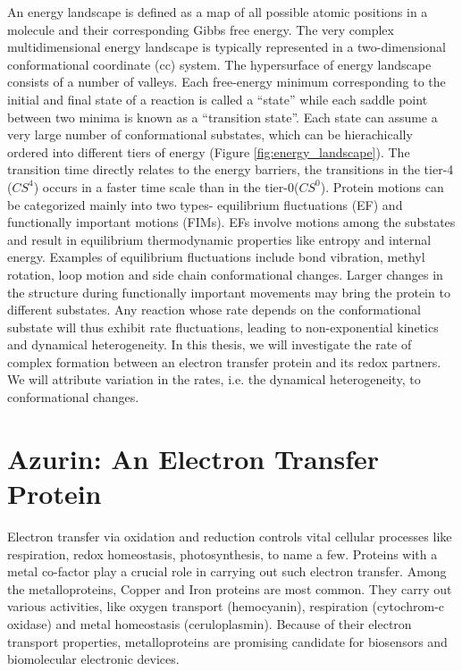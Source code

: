An energy landscape is defined as a map of all possible atomic positions in a molecule and their corresponding Gibbs free energy.
The very complex multidimensional energy landscape is typically represented in a two-dimensional conformational coordinate (cc) system.
The hypersurface of energy landscape consists of a number of valleys. Each free-energy minimum corresponding to the initial and final state of a reaction is called a ``state'' while each saddle point between two minima is known as a ``transition state''.
Each state can assume a very large number of conformational substates, which can be hierachically ordered into different tiers of energy (Figure \ref{fig:energy_landscape}).
The transition time directly relates to the energy barriers, the transitions in the tier-4 ($CS^4$) occurs in a faster time scale than in the tier-0($CS^0$).
Protein motions can be categorized mainly into two types- equilibrium fluctuations (EF) and  functionally important motions (FIMs).\cite{ansari1985protein}
EFs involve motions among the substates and result in equilibrium thermodynamic properties like entropy and internal energy. 
Examples of equilibrium fluctuations include bond vibration, methyl rotation, loop motion and side chain conformational changes. Larger changes in the structure during functionally important movements may bring the protein to different substates. Any reaction whose rate depends on the conformational substate will thus exhibit rate fluctuations, leading to non-exponential kinetics and dynamical heterogeneity. In this thesis, we will investigate the rate of complex formation between an electron transfer protein and its redox partners. We will attribute variation in the rates, i.e. the dynamical heterogeneity, to conformational changes.

\section{Azurin: An Electron Transfer Protein}
Electron transfer via oxidation and reduction controls vital cellular processes like respiration, redox homeostasis, photosynthesis, to name a few.
Proteins with a metal co-factor play a crucial role in carrying out such electron transfer.
Among the metalloproteins, Copper and Iron proteins are most common. They carry out various activities, like oxygen transport (hemocyanin), respiration (cytochrom-c oxidase) and metal homeostasis (ceruloplasmin).
Because of their electron transport properties, metalloproteins are promising candidate for biosensors and biomolecular electronic devices.

